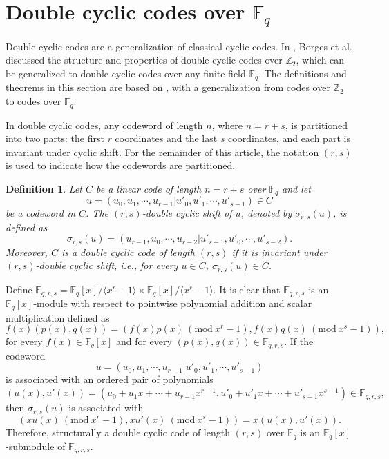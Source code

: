 \documentclass[12pt]{article}
\newtheorem{definition}{Definition}[section]
\newcommand{\Mod}[1]{\ (\mathrm{mod}\ #1)}
\begin{document}
	\section{Double cyclic codes over $\mathbb{F}_q$}
	Double cyclic codes are a generalization of classical cyclic codes. In \cite{Borges2018}, Borges et al. discussed the structure and properties of double cyclic codes over $\mathbb{Z}_2$, which can be generalized to double cyclic codes over any finite field $\mathbb{F}_q$. The definitions and theorems in this section are based on \cite{Borges2018}, with a generalization from codes over $\mathbb{Z}_2$ to codes over $\mathbb{F}_q$.
	
	In double cyclic codes, any codeword of length $n$, where $n=r+s$, is partitioned into two parts: the first $r$ coordinates and the last $s$ coordinates, and each part is invariant under cyclic shift. For the remainder of this article, the notation $(r,s)$ is used to indicate how the codewords are partitioned.
	
	\begin{definition}
		Let $C$ be a linear code of length $n=r+s$ over $\mathbb{F}_q$ and let
		$$u=(u_0,u_1,\cdots,u_{r-1}|u'_0,u'_1,\cdots,u'_{s-1})\in C$$
		be a codeword in $C$. The $(r,s)$-double cyclic shift of $u$, denoted by $\sigma_{r,s}(u)$, is defined as
		$$\sigma_{r,s}(u)=(u_{r-1},u_0,\cdots,u_{r-2}|u'_{s-1},u'_0,\cdots,u'_{s-2}).$$
		Moreover, $C$ is a double cyclic code of length $(r,s)$ if it is invariant under $(r,s)$-double cyclic shift, i.e., for every $u\in C$, $\sigma_{r,s}(u)\in C$.
	\end{definition}
	
	Define $\mathbb{F}_{q,r,s}=\mathbb{F}_q [x]/\langle x^r -1\rangle \times \mathbb{F}_q [x]/\langle x^s -1\rangle$. It is clear that $\mathbb{F}_{q,r,s}$ is an $\mathbb{F}_q [x]$-module with respect to pointwise polynomial addition and scalar multiplication defined as
	$$f(x) (p(x),q(x))=(f(x) p(x) \Mod{x^r-1},f(x) q(x) \Mod{x^s-1}),$$
	for every $f(x)\in \mathbb{F}_q [x]$ and for every $(p(x),q(x))\in\mathbb{F}_{q,r,s}$. If the codeword $$u=(u_0,u_1,\cdots,u_{r-1}|u'_0,u'_1,\cdots,u'_{s-1})$$ is associated with an ordered pair of polynomials
	$$(u(x),u'(x))=(u_0+u_1 x+\cdots+u_{r-1} x^{r-1}, u'_0+u'_1 x+\cdots+u'_{s-1} x^{s-1})\in \mathbb{F}_{q,r,s},$$
	then $\sigma_{r,s}(u)$ is associated with $$(x u(x) \Mod{x^r-1},x u'(x) \Mod{x^s-1})=x(u(x),u'(x)).$$
	Therefore, structurally a double cyclic code of length $(r,s)$ over $\mathbb{F}_q$ is an $\mathbb{F}_q [x]$-submodule of $\mathbb{F}_{q,r,s}$.
	
\end{document}
